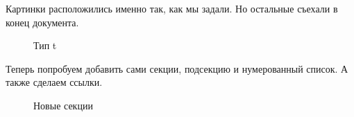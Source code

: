 \documentclass[
  english,
  russian,
  12pt,
  a4paper,
  DIV=11,
  numbers=noendperiod]{scrreprt}
\begin{document}
Картинки расположились именно так, как мы задали. Но остальные съехали в
конец документа.

\begin{figure}


\caption{\label{fig-027}Тип t}

\end{figure}%

Теперь попробуем добавить сами секции, подсекцию и нумерованный список.
А также сделаем ссылки.

\begin{figure}


\caption{\label{fig-028}Новые секции}

\end{figure}%
\end{document}
